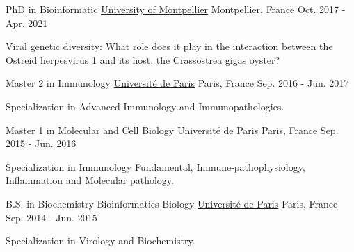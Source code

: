 

\begin{cventries}

  \cventry
    {PhD in Bioinformatic} %
    {\href{https://www.umontpellier.fr/en/}{University of Montpellier}} %
    {Montpellier, France} %
    {Oct. 2017 - Apr. 2021} %
    {
      \begin{cvitems} %
        \item {Viral genetic diversity: What role does it play in the interaction between the Ostreid herpesvirus 1 and its host, the Crassostrea gigas oyster?}
      \end{cvitems}
    }

  \cventry
    {Master 2 in Immunology} %
    {\href{https://u-paris.fr/en/universite-de-paris/}{Université de Paris}} %
    {Paris, France} %
    {Sep. 2016 - Jun. 2017} %
    {
      \begin{cvitems} %
        \item {Specialization in Advanced Immunology and Immunopathologies.}
      \end{cvitems}
    }

  \cventry
    {Master 1 in  Molecular and Cell Biology} %
    {\href{https://u-paris.fr/en/universite-de-paris/}{Université de Paris}} %
    {Paris, France} %
    {Sep. 2015 - Jun. 2016} %
    {
      \begin{cvitems} %
        \item {Specialization in Immunology Fundamental, Immune-pathophysiology, Inflammation and Molecular pathology.}
      \end{cvitems}
    }

  \cventry
    {B.S. in Biochemistry Bioinformatics Biology} %
    {\href{https://u-paris.fr/en/universite-de-paris/}{Université de Paris}} %
    {Paris, France} %
    {Sep. 2014 - Jun. 2015} %
    {
      \begin{cvitems} %
        \item {Specialization in Virology and Biochemistry.}
      \end{cvitems}
    }
    

\end{cventries}

